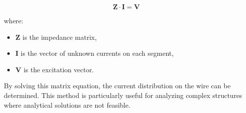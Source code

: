 \[
\mathbf{Z} \cdot \mathbf{I} = \mathbf{V}
\]

where:
\begin{itemize}
    \item \( \mathbf{Z} \) is the impedance matrix,
    \item \( \mathbf{I} \) is the vector of unknown currents on each segment,
    \item \( \mathbf{V} \) is the excitation vector.
\end{itemize}

By solving this matrix equation, the current distribution on the wire can be determined. This method is particularly useful for analyzing complex structures where analytical solutions are not feasible.

